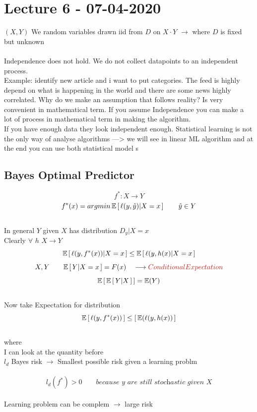 \documentclass[../main.tex]{subfiles}
\begin{document}
\chapter{Lecture 6 - 07-04-2020}

$(X, Y)$ We random variables drawn iid from $D$ on $X \cdot Y$ $\longrightarrow$ where $D$ is fixed but unknown\\\\
Independence does not hold. We do not collect datapoints to an independent
process.\\
Example: identify new article and i want to put categories. The feed is highly
depend on what is happening in the world and there are some news highly
correlated. Why do we make an assumption that follows reality?
Is very convenient in mathematical term.
If you assume Independence you can make a lot of process in mathematical
term in making the algorithm.\\
If you have enough data they look independent enough. Statistical learning is
not the only way of analyse algorithms —> we will see in linear ML algorithm
and at the end you can use both statistical model s

\section{Bayes Optimal Predictor}

$$ f^* : X \rightarrow Y$$
$$ f^*(x) = argmin \, \mathbb{E}\left[ \, \ell(y,\hat{y})| X=x \, \right] \qquad \hat{y} \in Y$$
\\
In general $Y$ given $X$ has distribution $D_y|X=x$
\\
Clearly $\forall$ $h$ \quad $X\rightarrow Y$
\\
$$
\mathbb{E} \left[ \, \ell(y, f^*(x)) | X=x \, \right] \leq \mathbb{E}\left[ \, \ell(y,h(x)| X = x \, \right] 
$$
$$
X,Y \qquad \barra{E} \left[ \, Y|X = x \, \right] = F(x) \quad \longrightarrow \red{Conditional Expectation} 
$$
$$
\mathbb{E} \left[ \, \mathbb{E} \left[ \, Y|X \, \right] \, \right] = \mathbb{E}(Y)
$$
\\
Now take Expectation for distribution
$$
\mathbb{E} \left[ \, \ell(y, f^*(x))\, \right] \leq \left[ \, \mathbb{E} (\ell(y, h(x)) \, \right]
$$
\\ where 
\\
I can look at the quantity before\\
$l_d$ Bayes risk $\longrightarrow$ Smallest possible risk given a learning problm
\\\\
$$
l_d(f^*) > 0 \qquad \textit{because y are still stochastic given X}
$$
\\
Learning problem can be complem $\rightarrow$ large risk
\\\\
\end{document}
